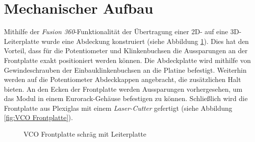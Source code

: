 \newpage
\section{Mechanischer Aufbau}
Mithilfe der \textit{Fusion 360}-Funktionalität der Übertragung einer 2D- auf eine 3D-Leiterplatte wurde eine Abdeckung konstruiert (siehe Abbildung \ref{fig:VCO Frontplattemit 3D-Leiterplatte}).
Dies hat den Vorteil, dass für die Potentiometer und Klinkenbuchsen die Aussparungen an der Frontplatte exakt positioniert werden können.
Die Abdeckplatte wird mithilfe von Gewindeschrauben der Einbauklinkenbuchsen an die Platine befestigt.
Weiterhin werden auf die Potentiometer Abdeckkappen angebracht, die zusätzlichen Halt bieten.
An den Ecken der Frontplatte werden Aussparungen vorhergesehen, um das Modul in einem Eurorack-Gehäuse befestigen zu können.
Schließlich wird die Frontplatte aus Plexiglas mit einem \textit{Laser-Cutter} gefertigt (siehe Abbildung \ref{fig:VCO Frontplatte}).


\begin{figure}[h]
	\centering
	\setlength{\fboxsep}{1pt} %
	\setlength{\fboxrule}{1pt} %
	\caption{VCO Frontplatte schräg mit Leiterplatte}
	\label{fig:VCO Frontplattemit 3D-Leiterplatte}
\end{figure}

